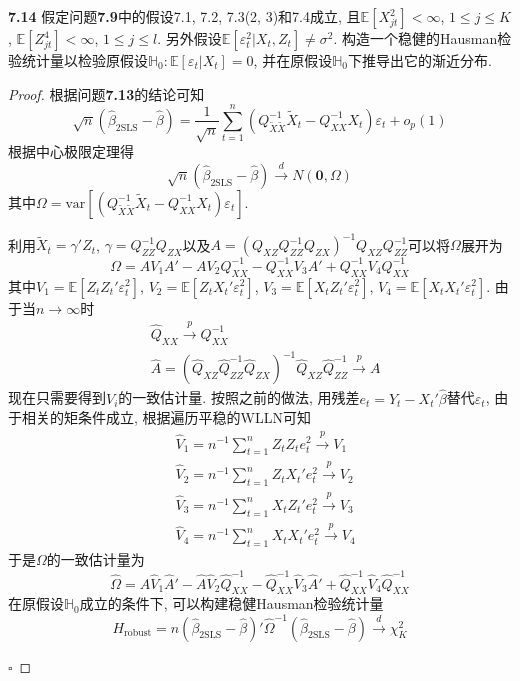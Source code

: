 \documentclass[cn,12pt,math=mtpro2,citestyle=gb7714-2015,bibstyle=gb7714-2015,twocol,mode=simple]{elegantbook}
\newcommand{\HH}{\mathbb{H}}
\newcommand{\E}{\mathbb{E}}
\newcommand{\hbeta}{\hat{\beta}}
\newcommand{\btls}{\hat{\beta}_{\text{2SLS}}}
\newcommand{\QXZ}{\hat{Q}_{XZ}}
\newcommand{\QZZ}{\hat{Q}_{ZZ}}
\newcommand{\QZX}{\hat{Q}_{ZX}}
\begin{document}
\textbf{7.14} 假定问题\textbf{7.9}中的假设7.1, 7.2, 7.3(2, 3)和7.4成立, 且$\E[X_{jt}^2]<\infty$, $1\leq j\leq K$, $\E[Z_{jt}^4]<\infty$, $1\leq j\leq l$. 另外假设$\E[\varepsilon_t^2|X_t,Z_t]\neq\sigma^2$. 构造一个稳健的Hausman检验统计量以检验原假设$\HH_0:\E[\varepsilon_t|X_t]=0$, 并在原假设$\HH_0$下推导出它的渐近分布.

\begin{proof}
根据问题\textbf{7.13}的结论可知
$$\sqrt{n}(\btls-\hbeta)=\frac{1}{\sqrt{n}}\sum_{t=1}^{n}\left(Q_{\tilde{X}\tilde{X}}^{-1}\tilde{X}_t-Q_{XX}^{-1}X_t\right)\varepsilon_t+o_p(1)$$
根据中心极限定理得
$$\sqrt{n}(\btls-\hbeta)\xrightarrow{d}N(\mathbf{0},\Omega)$$
  其中$\Omega=\text{var}\left[\left(Q_{\tilde{X}\tilde{X}}^{-1}\tilde{X}_t-Q_{XX}^{-1}X_t\right)\varepsilon_t\right]$.

  利用$\tilde{X}_t=\gamma'Z_t$, $\gamma=Q_{ZZ}^{-1}Q_{ZX}$以及$A=(Q_{XZ}Q_{ZZ}^{-1}Q_{ZX})^{-1}Q_{XZ}Q_{ZZ}^{-1}$可以将$\Omega$展开为
  $$\Omega=AV_1A'-AV_2Q_{XX}^{-1}-Q_{XX}^{-1}V_3A'+Q_{XX}^{-1}V_4Q_{XX}^{-1}$$
  其中$V_1=\E[Z_tZ_t'\varepsilon_t^2]$, $V_2=\E[Z_tX_t'\varepsilon_t^2]$, $V_3=\E[X_tZ_t'\varepsilon_t^2]$, $V_4=\E[X_tX_t'\varepsilon_t^2]$. 由于当$n\to\infty$时
  \begin{align*}
  &\hat{Q}_{XX}\xrightarrow{p} Q_{XX}^{-1} \\
  &\hat{A}=(\QXZ\QZZ^{-1}\QZX)^{-1}\QXZ\QZZ^{-1}\xrightarrow{p}A
  \end{align*}
  现在只需要得到$V_i$的一致估计量. 按照之前的做法, 用残差$e_t=Y_t-X_t'\hbeta$替代$\varepsilon_t$, 由于相关的矩条件成立, 根据遍历平稳的WLLN可知
  \begin{align*}
  &\hat{V}_1=n^{-1}\sum_{t=1}^{n}Z_tZ_te_t^2\xrightarrow{p}V_1 \\
  &\hat{V}_2=n^{-1}\sum_{t=1}^{n}Z_tX_t'e_t^2\xrightarrow{p}V_2 \\
  &\hat{V}_3=n^{-1}\sum_{t=1}^{n}X_tZ_t'e_t^2\xrightarrow{p}V_3 \\
  &\hat{V}_4=n^{-1}\sum_{t=1}^{n}X_tX_t'e_t^2\xrightarrow{p}V_4
  \end{align*}
  于是$\Omega$的一致估计量为
  $$\hat{\Omega}=\hat{A}\hat{V}_1\hat{A}'-\hat{A}\hat{V}_2\hat{Q}_{XX}^{-1}-\hat{Q}_{XX}^{-1}\hat{V}_3\hat{A}'+\hat{Q}_{XX}^{-1}\hat{V}_4\hat{Q}_{XX}^{-1}$$
  在原假设$\HH_0$成立的条件下, 可以构建稳健Hausman检验统计量
  $$H_{\text{robust}}=n(\btls-\hbeta)'\hat{\Omega}^{-1}(\btls-\hbeta)\xrightarrow{d}\chi_K^2$$

  $\square$

\end{proof}
\end{document}
